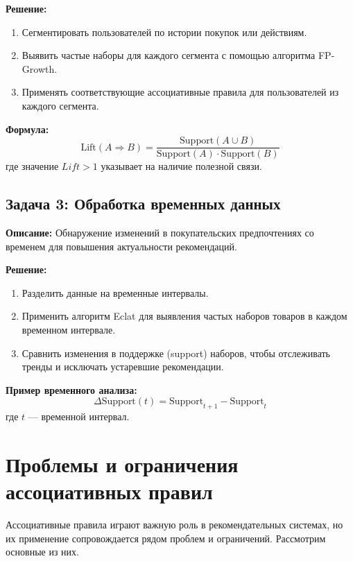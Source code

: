 \textbf{Решение:}
\begin{enumerate}
    \item Сегментировать пользователей по истории покупок или действиям.
    \item Выявить частые наборы для каждого сегмента с помощью алгоритма FP-Growth.
    \item Применять соответствующие ассоциативные правила для пользователей из каждого сегмента.
\end{enumerate}

\textbf{Формула:}
\begin{equation}
    \text{Lift}(A \Rightarrow B) = \frac{\text{Support}(A \cup B)}{\text{Support}(A) \cdot \text{Support}(B)}
\end{equation}
где значение $Lift > 1$ указывает на наличие полезной связи.

\subsection{Задача 3: Обработка временных данных}
\textbf{Описание:} 
Обнаружение изменений в покупательских предпочтениях со временем для повышения актуальности рекомендаций.

\textbf{Решение:}
\begin{enumerate}
    \item Разделить данные на временные интервалы.
    \item Применить алгоритм Eclat для выявления частых наборов товаров в каждом временном интервале.
    \item Сравнить изменения в поддержке (support) наборов, чтобы отслеживать тренды и исключать устаревшие рекомендации.
\end{enumerate}

\textbf{Пример временного анализа:}
\begin{equation}
    \Delta \text{Support}(t) = \text{Support}_{t+1} - \text{Support}_{t}
\end{equation}
где $t$ — временной интервал.



\section{Проблемы и ограничения ассоциативных правил}

Ассоциативные правила играют важную роль в рекомендательных системах, но их применение сопровождается рядом проблем и ограничений. Рассмотрим основные из них.

